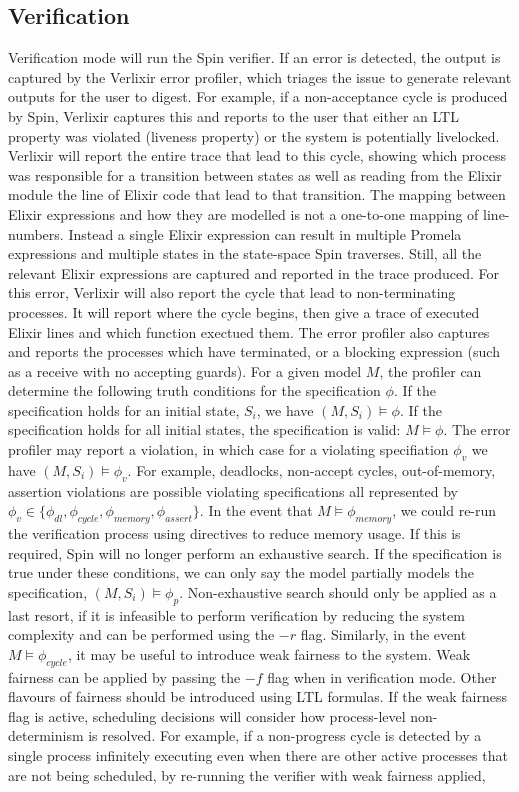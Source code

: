 \subsection{Verification}
Verification mode will run the Spin verifier. If an error is detected, the output is captured by the Verlixir error profiler, which triages the issue to generate relevant outputs for the user to digest. For example, if a non-acceptance cycle is produced by Spin, Verlixir captures this and reports to the user that either an LTL property was violated (liveness property) or the system is potentially livelocked. Verlixir will report the entire trace that lead to this cycle, showing which process was responsible for a transition between states as well as reading from the Elixir module the line of Elixir code that lead to that transition. The mapping between Elixir expressions and how they are modelled is not a one-to-one mapping of line-numbers. Instead a single Elixir expression can result in multiple Promela expressions and multiple states in the state-space Spin traverses. Still, all the relevant Elixir expressions are captured and reported in the trace produced. For this error, Verlixir will also report the cycle that lead to non-terminating processes. It will report where the cycle begins, then give a trace of executed Elixir lines and which function exectued them. The error profiler also captures and reports the processes which have terminated, or a blocking expression (such as a receive with no accepting guards). For a given model $M$, the profiler can determine the following truth conditions for the specification $\phi$. If the specification holds for an initial state, $S_i$, we have $(M, S_i) \models \phi$. If the specification holds for all initial states, the specification is valid: $M \models \phi$. The error profiler may report a violation, in which case for a violating specifiation $\phi _v$ we have $(M, S_i) \models \phi _v$. For example, deadlocks, non-accept cycles, out-of-memory, assertion violations are possible violating specifications all represented by $\phi _v \in \{\phi _{dl}, \phi _{cycle}, \phi _{memory}, \phi _{assert}\}$. In the event that $M \models \phi _{memory}$, we could re-run the verification process using directives to reduce memory usage. If this is required, Spin will no longer perform an exhaustive search. If the specification is true under these conditions, we can only say the model partially models the specification, $(M, S_i) \models \phi _p$. Non-exhaustive search should only be applied as a last resort, if it is infeasible to perform verification by reducing the system complexity and can be performed using the $-r$ flag. Similarly, in the event $M \models \phi _{cycle}$, it may be useful to introduce weak fairness to the system. Weak fairness can be applied by passing the $-f$ flag when in verification mode. Other flavours of fairness should be introduced using LTL formulas. If the weak fairness flag is active, scheduling decisions will consider how process-level non-determinism is resolved. For example, if a non-progress cycle is detected by a single process infinitely executing even when there are other active processes that are not being scheduled, by re-running the verifier with weak fairness applied, 